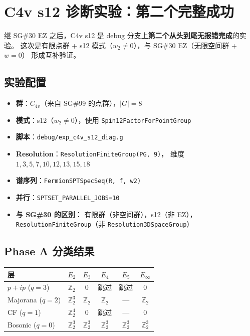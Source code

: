 \documentclass[a4paper,fontset=ubuntu,12pt]{ctexart}
\begin{document}
\section{C4v s12 诊断实验：第二个完整成功}
\label{sec:c4v-s12-success}

继 SG\#30 EZ 之后，C4v s12 是 debug 分支上\textbf{第二个从头到尾无报错完成}的实验。
这次是有限点群 + s12 模式（$w_2 \neq 0$），与 SG\#30 EZ（无限空间群 + $w = 0$）
形成互补验证。

\subsection{实验配置}

\begin{itemize}
\item \textbf{群}：$C_{4v}$（来自 SG\#99 的点群），$|G| = 8$
\item \textbf{模式}：s12（$w_2 \neq 0$），使用 \texttt{Spin12FactorForPointGroup}
\item \textbf{脚本}：\texttt{debug/exp\_c4v\_s12\_diag.g}
\item \textbf{Resolution}：\texttt{ResolutionFiniteGroup(PG, 9)}，
      维度 $1, 3, 5, 7, 10, 12, 13, 15, 18$
\item \textbf{谱序列}：\texttt{FermionSPTSpecSeq(R, f, w2)}
\item \textbf{并行}：\texttt{SPTSET\_PARALLEL\_JOBS=10}
\item \textbf{与 SG\#30 的区别}：
      有限群（非空间群），s12（非 EZ），\texttt{ResolutionFiniteGroup}（非 \texttt{Resolution3DSpaceGroup}）
\end{itemize}

\subsection{Phase A 分类结果}

\begin{center}
\begin{tabular}{l|cccc|c}
\hline
层 & $E_2$ & $E_3$ & $E_4$ & $E_5$ & $E_\infty$ \\
\hline
$p{+}ip$ ($q=3$) & $\mathbb{Z}_2$ & $0$ & 跳过 & 跳过 & $0$ \\
Majorana ($q=2$) & $\mathbb{Z}_2^3$ & $\mathbb{Z}_2$ & $\mathbb{Z}_2$ & --- & $\mathbb{Z}_2$ \\
CF ($q=1$) & $\mathbb{Z}_2^4$ & $0$ & 跳过 & --- & $0$ \\
Bosonic ($q=0$) & $\mathbb{Z}_2^3$ & $\mathbb{Z}_2^3$ & $\mathbb{Z}_2^3$ & $\mathbb{Z}_2^3$ & $\mathbb{Z}_2^3$ \\
\hline
\end{tabular}
\end{center}
\end{document}
